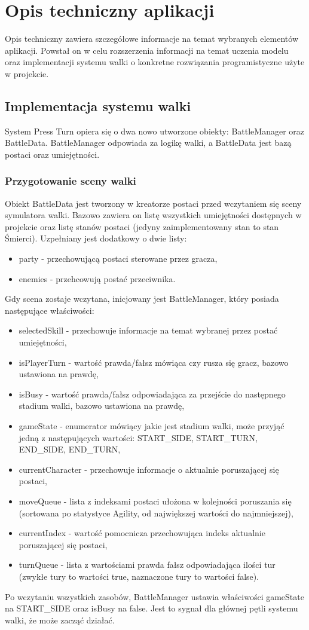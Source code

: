 \documentclass{SGGW-thesis}
\begin{document}
\chapter{Opis techniczny aplikacji}
Opis techniczny zawiera szczegółowe informacje na temat wybranych elementów aplikacji. Powstał on w celu rozszerzenia informacji na temat uczenia modelu oraz implementacji systemu walki o konkretne rozwiązania programistyczne użyte w projekcie.
\section{Implementacja systemu walki}
System Press Turn opiera się o dwa nowo utworzone obiekty: BattleManager oraz BattleData. BattleManager odpowiada za logikę walki, a BattleData jest bazą postaci oraz umiejętności.
\subsection{Przygotowanie sceny walki}
Obiekt BattleData jest tworzony w kreatorze postaci przed wczytaniem się sceny symulatora walki. Bazowo zawiera on listę wszystkich umiejętności dostępnych w projekcie oraz listę stanów postaci (jedyny zaimplementowany stan to stan Śmierci). 
Uzpełniany jest dodatkowy o dwie listy:
\begin{itemize}
  \item party - przechowującą postaci sterowane przez gracza,
  \item enemies - przehcowują postać przeciwnika.
\end{itemize}
Gdy scena zostaje wczytana, inicjowany jest BattleManager, który posiada następujące właściwości:
\begin{itemize}
  \item{selectedSkill - przechowuje informacje na temat wybranej przez postać umiejętności},
  \item{isPlayerTurn - wartość prawda/fałsz mówiąca czy rusza się gracz, bazowo ustawiona na prawdę},
  \item{isBusy - wartość prawda/fałsz odpowiadająca za przejście do następnego stadium walki, bazowo ustawiona na prawdę},
  \item{gameState - enumerator mówiący jakie jest stadium walki, może przyjąć jedną z następujących wartości: START\_SIDE, START\_TURN, END\_SIDE, END\_TURN},
  \item{currentCharacter - przechowuje informacje o aktualnie poruszającej się postaci},
  \item{moveQueue - lista z indeksami postaci ułożona w kolejności poruszania się (sortowana po statystyce Agility, od największej wartości do najmniejszej)},
  \item{currentIndex - wartość pomocnicza przechowująca indeks aktualnie poruszającej się postaci},
  \item{turnQueue - lista z wartościami prawda fałsz odpowiadająca ilości tur (zwykłe tury to wartości true, naznaczone tury to wartości false)}.
\end{itemize}
Po wczytaniu wszystkich zasobów, BattleManager ustawia właściwości gameState na START\_SIDE oraz isBusy na false.
Jest to sygnał dla głównej pętli systemu walki, że może zacząć działać.
\end{document}
